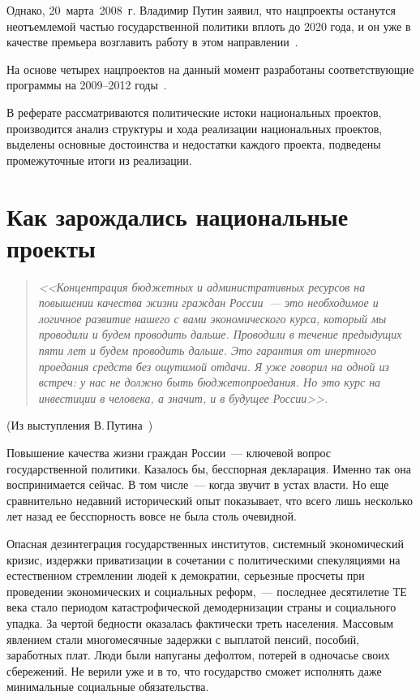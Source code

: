 \documentclass[article, 12pt, russian, oneside]{ncc}
\begin{document}
Однако, 20~марта~2008~г. Владимир Путин заявил, что нацпроекты
останутся неотъемлемой частью государственной политики вплоть до 2020
года, и он уже в качестве премьера возглавить работу в этом
направлении~\cite{Gazeta}.

На основе четырех нацпроектов на данный момент разработаны
соответствующие программы на 2009--2012 годы~\cite{PNP}.

В реферате рассматриваются политические истоки национальных проектов,
производится анализ структуры и хода реализации национальных проектов,
выделены основные достоинства и недостатки каждого проекта, подведены
промежуточные итоги из реализации.

\newpage

\section{Как зарождались национальные проекты}

\begin{quote}
  \emph{<<Концентрация бюджетных и административных ресурсов на
    повышении качества жизни граждан России~--- это необходимое и
    логичное развитие нашего с вами экономического курса, который мы
    проводили и будем проводить дальше. Проводили в течение предыдущих
    пяти лет и будем проводить дальше. Это гарантия от инертного
    проедания средств без ощутимой отдачи. Я уже говорил на одной из
    встреч: у нас не должно быть бюджетопроедания. Но это курс на
    инвестиции в человека, а значит, и в будущее России>>.}
\end{quote}
\begin{flushright}
  (Из выступления В.\,Путина~\cite{Putin_RG})
\end{flushright}

Повышение качества жизни граждан России~--- ключевой вопрос
государственной политики. Казалось бы, бесспорная декларация. Именно
так она воспринимается сейчас. В том числе~--- когда звучит в устах
власти. Но еще сравнительно недавний исторический опыт показывает, что
всего лишь несколько лет назад ее бесспорность вовсе не была столь
очевидной.

Опасная дезинтеграция государственных институтов, системный
экономический кризис, издержки приватизации в сочетании с
политическими спекуляциями на естественном стремлении людей к
демократии, серьезные просчеты при проведении экономических и
социальных реформ,~--- последнее десятилетие ТЕ века стало периодом
катастрофической демодернизации страны и социального упадка. За чертой
бедности оказалась фактически треть населения. Массовым явлением стали
многомесячные задержки с выплатой пенсий, пособий, заработных
плат. Люди были напуганы дефолтом, потерей в одночасье своих
сбережений. Не верили уже и в то, что государство сможет исполнять
даже минимальные социальные обязательства.
\end{document}
